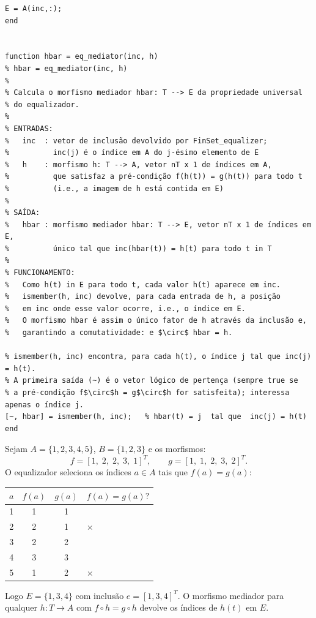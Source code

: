 \begin{lstlisting}[style=matlab, caption={Equalizador em FinSet --- implementação e propriedade universal}]
% E é o subconjunto de A indexado por inc, i.e., E = {a in A : f(a) = g(a)}
E = A(inc,:);
end


function hbar = eq_mediator(inc, h)
% hbar = eq_mediator(inc, h)
%
% Calcula o morfismo mediador hbar: T --> E da propriedade universal
% do equalizador.
%
% ENTRADAS:
%   inc  : vetor de inclusão devolvido por FinSet_equalizer;
%          inc(j) é o índice em A do j-ésimo elemento de E
%   h    : morfismo h: T --> A, vetor nT x 1 de índices em A,
%          que satisfaz a pré-condição f(h(t)) = g(h(t)) para todo t
%          (i.e., a imagem de h está contida em E)
%
% SAÍDA:
%   hbar : morfismo mediador hbar: T --> E, vetor nT x 1 de índices em E,
%          único tal que inc(hbar(t)) = h(t) para todo t in T
%
% FUNCIONAMENTO:
%   Como h(t) in E para todo t, cada valor h(t) aparece em inc.
%   ismember(h, inc) devolve, para cada entrada de h, a posição
%   em inc onde esse valor ocorre, i.e., o índice em E.
%   O morfismo hbar é assim o único fator de h através da inclusão e,
%   garantindo a comutatividade: e $\circ$ hbar = h.

% ismember(h, inc) encontra, para cada h(t), o índice j tal que inc(j) = h(t).
% A primeira saída (~) é o vetor lógico de pertença (sempre true se
% a pré-condição f$\circ$h = g$\circ$h for satisfeita); interessa apenas o índice j.
[~, hbar] = ismember(h, inc);   % hbar(t) = j  tal que  inc(j) = h(t)
end
\end{lstlisting}

\begin{example}
	Sejam $A = \{1,2,3,4,5\}$, $B = \{1,2,3\}$ e os morfismos:
	\[
	f = [1,\;2,\;2,\;3,\;1]^T, \qquad g = [1,\;1,\;2,\;3,\;2]^T.
	\]
	O equalizador seleciona os índices $a \in A$ tais que $f(a) = g(a)$:
	
	\medskip
	\begin{center}
		\begin{tabular}{cccl}
			\toprule
			$a$ & $f(a)$ & $g(a)$ & $f(a)=g(a)?$ \\
			\midrule
			1 & 1 & 1 & \checkmark \\
			2 & 2 & 1 & $\times$ \\
			3 & 2 & 2 & \checkmark \\
			4 & 3 & 3 & \checkmark \\
			5 & 1 & 2 & $\times$ \\
			\bottomrule
		\end{tabular}
	\end{center}
	\medskip
	
	Logo $E = \{1, 3, 4\}$ com inclusão $e = [1, 3, 4]^T$.
	O morfismo mediador para qualquer $h: T \to A$ com
	$f \circ h = g \circ h$ devolve os índices de $h(t)$ em $E$.
\end{example}

